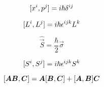 \begin{equation}
    [x^{i},p^{j}] = i \hbar \delta^{ij}
\end{equation}

\begin{equation}
    [L^{i},L^{j}] = i\hbar \epsilon^{ijk}L^{k}
\end{equation}

\begin{equation}
    \hat{\vec{S}} = \frac{\hbar}{2} \vec{\sigma}
\end{equation}

\begin{equation}
    [S^{i},S^{j}] = i\hbar \epsilon^{ijk}S^{k}
\end{equation}

\begin{equation}
    [\boldsymbol{A} \boldsymbol{B},\boldsymbol{C}] = \boldsymbol{A}[\boldsymbol{B},\boldsymbol{C}] + [\boldsymbol{A},\boldsymbol{B}]\boldsymbol{C}
\end{equation}
